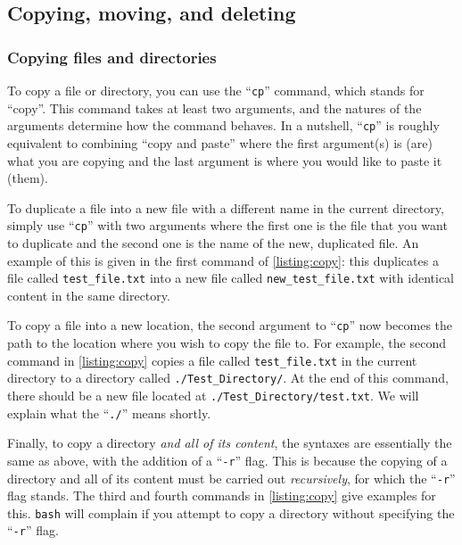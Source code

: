   \subsection{Copying, moving, and deleting}

    \subsubsection{Copying files and directories}

      To copy a file or directory, you can use the \enquote{\texttt{cp}} command, which stands for \enquote{copy}.
      This command takes at least two arguments, and the natures of the arguments determine how the command behaves.
      In a nutshell, \enquote{\texttt{cp}} is roughly equivalent to combining  \enquote{copy and paste} where the first argument(s) is (are) what you are copying and the last argument is where you would like to paste it (them).

      To duplicate a file into a new file with a different name in the current directory, simply use \enquote{\texttt{cp}} with two arguments where the first one is the file that you want to duplicate and the second one is the name of the new, duplicated file.
      An example of this is given in the first command of \cref{listing:copy}: this duplicates a file called \texttt{test\_file.txt} into a new file called \texttt{new\_test\_file.txt} with identical content in the same directory.

      To copy a file into a new location, the second argument to \enquote{\texttt{cp}} now becomes the path to the location where you wish to copy the file to.
      For example, the second command in \cref{listing:copy} copies a file called \texttt{test\_file.txt} in the current directory to a directory called \texttt{./Test\_Directory/}.
      At the end of this command, there should be a new file located at \texttt{./Test\_Directory/test.txt}.
      We will explain what the \enquote{\texttt{./}} means shortly.

      Finally, to copy a directory \emph{and all of its content}, the syntaxes are essentially the same as above, with the addition of a \enquote{\texttt{-r}} flag.
      This is because the copying of a directory and all of its content must be carried out \emph{recursively}, for which the \enquote{\texttt{-r}} flag stands.
      The third and fourth commands in \cref{listing:copy} give examples for this.
      \texttt{bash} will complain if you attempt to copy a directory without specifying the \enquote{\texttt{-r}} flag.

